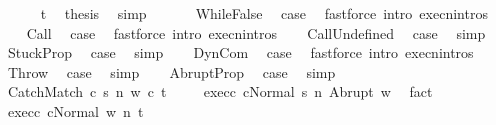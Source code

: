 \begin{isabellebody}
\ \ \ \ \isamarkupfalse%
\ t\ \isamarkupfalse%
\ {\isacharquery}thesis\ \isamarkupfalse%
\ simp\isanewline
\ \ \isamarkupfalse%
\isanewline
{}\isamarkupfalse%
\isanewline
\ \ \isamarkupfalse%
\ WhileFalse\ \isamarkupfalse%
\ {\isacharquery}case\ \isamarkupfalse%
\ {\isacharparenleft}fastforce\ intro{\isacharcolon}\ execn{\isachardot}intros{\isacharparenright}\isanewline
{}\isamarkupfalse%
\isanewline
\ \ \isamarkupfalse%
\ Call\ \isamarkupfalse%
\ {\isacharquery}case\ \isamarkupfalse%
\ {\isacharparenleft}fastforce\ intro{\isacharcolon}\ execn{\isachardot}intros{\isacharparenright}\isanewline
{}\isamarkupfalse%
\isanewline
\ \ \isamarkupfalse%
\ CallUndefined\ \isamarkupfalse%
\ {\isacharquery}case\ \isamarkupfalse%
\ simp\isanewline
{}\isamarkupfalse%
\isanewline
\ \ \isamarkupfalse%
\ StuckProp\ \isamarkupfalse%
\ {\isacharquery}case\ \isamarkupfalse%
\ simp\isanewline
{}\isamarkupfalse%
\isanewline
\ \ \isamarkupfalse%
\ DynCom\ \isamarkupfalse%
\ {\isacharquery}case\ \isamarkupfalse%
\ {\isacharparenleft}fastforce\ intro{\isacharcolon}\ execn{\isachardot}intros{\isacharparenright}\isanewline
{}\isamarkupfalse%
\isanewline
\ \ \isamarkupfalse%
\ Throw\ \isamarkupfalse%
\ {\isacharquery}case\ \isamarkupfalse%
\ simp\isanewline
{}\isamarkupfalse%
\isanewline
\ \ \isamarkupfalse%
\ AbruptProp\ \isamarkupfalse%
\ {\isacharquery}case\ \isamarkupfalse%
\ simp\isanewline
{}\isamarkupfalse%
\isanewline
\ \ \isamarkupfalse%
\ {\isacharparenleft}CatchMatch\ c{}\ s\ n\ w\ c{}\ t{\isacharparenright}\ \isanewline
\ \ \isamarkupfalse%
\ exec{\isacharunderscore}c{}{\isacharcolon}\ {\isachardoublequoteopen}{\isasymGamma}{\isasymturnstile}{\isasymlangle}c{}{\isacharcomma}Normal\ s{\isasymrangle}\ {\isacharequal}n{\isasymRightarrow}\ Abrupt\ w{\isachardoublequoteclose}\ \isamarkupfalse%
\ fact\isanewline
\ \ \isamarkupfalse%
\ exec{\isacharunderscore}c{}{\isacharcolon}\ {\isachardoublequoteopen}{\isasymGamma}{\isasymturnstile}{\isasymlangle}c{}{\isacharcomma}Normal\ w{\isasymrangle}\ {\isacharequal}n{\isasymRightarrow}\ t{\isachardoublequoteclose}\ \isamarkupfalse%

\end{isabellebody}
